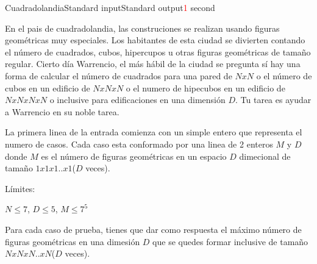 \begin{problem}{Cuadradolandia}{Standard input}{Standard output}{\textcolor{red}{1} second}{}

En el pais de cuadradolandia, las construciones se realizan usando figuras geométricas muy especiales. Los habitantes de esta ciudad se divierten contando el número de cuadrados, cubos, hipercupos u otras figuras geométricas de tamaño regular. Cierto día Warrencio, el más hábil de la ciudad se pregunta sí hay una forma de calcular el número de cuadrados para una pared de $NxN$ o el número de cubos en un edificio de $NxNxN$ o el numero de hipecubos en un edificio de $NxNxNxN$ o inclusive para edificaciones en una dimensión $D$. Tu tarea es ayudar a Warrencio en su noble tarea.

\InputFile
La primera linea de la entrada comienza con un simple entero que representa el numero de casos. Cada caso esta conformado por una linea de 2 enteros $M$ y $D$ donde $M$ es el número de figuras geométricas en un espacio $D$ dimecional de tamaño $1x1x1..x1$($D$ veces). 

Límites:

$N \leq 7$, $D \leq 5$, $M \leq 7^5$ 

\OutputFile
Para cada caso de prueba, tienes que dar como respuesta el máximo número de figuras geométricas en una dimesión $D$ que se quedes formar inclusive de tamaño $NxNxN..xN$($D$ veces). 


\Example

\begin{example}
\end{example}

\end{problem}
